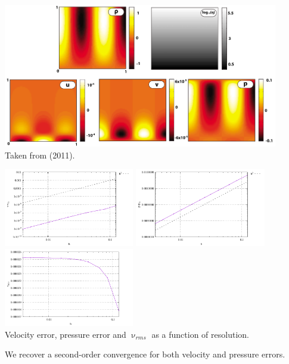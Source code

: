 \begin{center}
\includegraphics[width=12cm]{python_codes/fieldstone_158/images/solkz}\\
{\captionfont Taken from \textcite{dumg11} (2011). }
\end{center} 

\begin{center}
\includegraphics[width=5.7cm]{python_codes/fieldstone_158/results/exp2/errv}
\includegraphics[width=5.7cm]{python_codes/fieldstone_158/results/exp2/errp}
\includegraphics[width=5.7cm]{python_codes/fieldstone_158/results/exp2/vrms}\\
{\captionfont Velocity error, pressure error and $\upnu_{rms}$ as a function of resolution.}
\end{center}

We recover a second-order convergence for both velocity and pressure errors.


